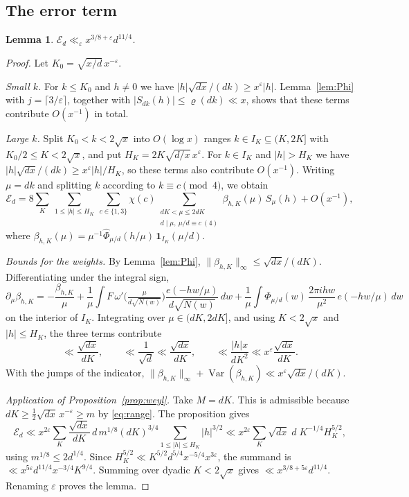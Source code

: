 \documentclass[11pt]{amsart}
\newtheorem{lemma}[theorem]{Lemma}
\theoremstyle{remark}
\theoremstyle{definition}
\numberwithin{equation}{section}
\newcommand{\eps}{\varepsilon}
\newcommand{\Var}{\operatorname{Var}}
\begin{document}
\subsection{The error term}

\begin{lemma}\label{lem:error}
$\mathcal E_d\ll_\eps x^{3/8+\eps}d^{11/4}$.
\end{lemma}

\begin{proof}
Let $K_0=\sqrt{x/d}\,x^{-\eps}$.

\emph{Small $k$.} For $k\le K_0$ and $h\ne0$ we have $|h|\sqrt{dx}/(dk)\ge x^{\eps}|h|$. Lemma~\ref{lem:Phi} with $j=\lceil 3/\eps\rceil$, together with $|S_{dk}(h)|\le\varrho(dk)\ll x$, shows that these terms contribute $O(x^{-1})$ in total.

\emph{Large $k$.} Split $K_0<k<2\sqrt x$ into $O(\log x)$ ranges $k\in I_K\subseteq(K,2K]$ with $K_0/2\le K<2\sqrt x$, and put $H_K=2K\sqrt{d/x}\,x^{\eps}$. For $k\in I_K$ and $|h|>H_K$ we have $|h|\sqrt{dx}/(dk)\ge x^{\eps}|h|/H_K$, so these terms also contribute $O(x^{-1})$. Writing $\mu=dk$ and splitting $k$ according to $k\equiv c\pmod 4$, we obtain
\[
\mathcal E_d=8\sum_{K}\ \sum_{1\le|h|\le H_K}\ \sum_{c\in\{1,3\}}\chi(c)\sum_{\substack{dK<\mu\le2dK\\ d\mid\mu,\ \mu/d\equiv c\ (4)}}\beta_{h,K}(\mu)\,S_\mu(h)+O(x^{-1}),
\]
where $\beta_{h,K}(\mu)=\mu^{-1}\hat\Phi_{\mu/d}(h/\mu)\,\mathbf 1_{I_K}(\mu/d)$.

\emph{Bounds for the weights.} By Lemma~\ref{lem:Phi}, $\|\beta_{h,K}\|_\infty\le\sqrt{dx}/(dK)$. Differentiating under the integral sign,
\[
\partial_\mu\beta_{h,K}=-\frac{\beta_{h,K}}{\mu}+\frac1\mu\int\!F\,\omega'\bigl(\tfrac{\mu}{d\sqrt{N(w)}}\bigr)\frac{e(-hw/\mu)}{d\sqrt{N(w)}}\,dw+\frac1\mu\int\!\Phi_{\mu/d}(w)\,\frac{2\pi i hw}{\mu^2}\,e(-hw/\mu)\,dw
\]
on the interior of $I_K$. Integrating over $\mu\in(dK,2dK]$, and using $K<2\sqrt x$ and $|h|\le H_K$, the three terms contribute
\[
\ll\frac{\sqrt{dx}}{dK},\qquad\ll\frac1{\sqrt d}\ll\frac{\sqrt{dx}}{dK},\qquad\ll\frac{|h|x}{dK^2}\ll x^{\eps}\frac{\sqrt{dx}}{dK}.
\]
With the jumps of the indicator, $\|\beta_{h,K}\|_\infty+\Var(\beta_{h,K})\ll x^{\eps}\sqrt{dx}/(dK)$.

\emph{Application of Proposition~\ref{prop:weyl}.} Take $M=dK$. This is admissible because $dK\ge\frac12\sqrt{dx}\,x^{-\eps}\ge m$ by \eqref{eq:range}. The proposition gives
\[
\mathcal E_d\ll x^{2\eps}\sum_K\frac{\sqrt{dx}}{dK}\,d\,m^{1/8}(dK)^{3/4}\sum_{1\le|h|\le H_K}|h|^{3/2}
\ll x^{2\eps}\sum_K\sqrt{dx}\;d\;K^{-1/4}H_K^{5/2},
\]
using $m^{1/8}\le 2d^{1/4}$. Since $H_K^{5/2}\ll K^{5/2}d^{5/4}x^{-5/4}x^{3\eps}$, the summand is $\ll x^{5\eps}d^{11/4}x^{-3/4}K^{9/4}$. Summing over dyadic $K<2\sqrt x$ gives $\ll x^{3/8+5\eps}d^{11/4}$. Renaming $\eps$ proves the lemma.
\end{proof}
\end{document}
